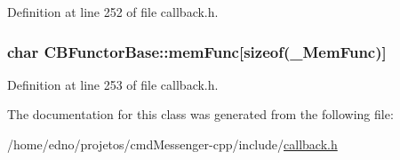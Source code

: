 Definition at line 252 of file callback.\+h.

\hypertarget{class_c_b_functor_base_af64bc23d3a1821de1a1ab2365f98b13c}{
\subsubsection[{mem\+Func}]{\setlength{\rightskip}{0pt plus 5cm}char C\+B\+Functor\+Base\+::mem\+Func\mbox{[}sizeof({\bf \+\_\+\+Mem\+Func})\mbox{]}}}\label{class_c_b_functor_base_af64bc23d3a1821de1a1ab2365f98b13c}


Definition at line 253 of file callback.\+h.



The documentation for this class was generated from the following file\+:\begin{DoxyCompactItemize}
\item 
/home/edno/projetos/cmd\+Messenger-\/cpp/include/\hyperlink{callback_8h}{callback.\+h}\end{DoxyCompactItemize}
